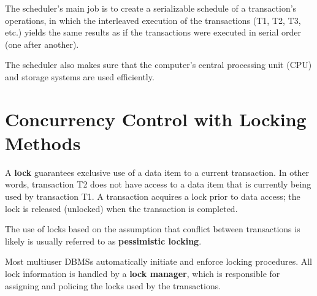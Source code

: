 \documentclass[a4paper, 11pt, titlepage]{report}
\begin{document}
The scheduler's main job is to create a serializable schedule of a transaction's operations, in which the interleaved execution of the transactions (T1, T2, T3, etc.) yields the same results as if the transactions were executed in serial order (one after another).

The scheduler also makes sure that the computer's central processing unit (CPU) and
storage systems are used efficiently.
\section{Concurrency Control with Locking Methods}
 A \textbf{lock} guarantees exclusive use of a data item to a current transaction. In other words, transaction T2 does not have access to a data item that is currently being used by transaction T1. A transaction acquires a lock prior to data access; the lock is released (unlocked) when the transaction is completed.

The use of locks based on the assumption that conflict between transactions is likely is usually referred to as \textbf{pessimistic locking}.

Most multiuser DBMSs automatically initiate and enforce locking procedures. All lock information is handled by a \textbf{lock manager}, which is responsible for assigning and policing the locks used by the transactions.
\end{document}
